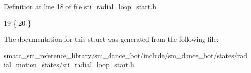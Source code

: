 Definition at line 18 of file sti\+\_\+radial\+\_\+loop\+\_\+start.\+h.


\begin{DoxyCode}
19   \{
20   \}
\end{DoxyCode}


The documentation for this struct was generated from the following file\+:\begin{DoxyCompactItemize}
\item 
smacc\+\_\+sm\+\_\+reference\+\_\+library/sm\+\_\+dance\+\_\+bot/include/sm\+\_\+dance\+\_\+bot/states/radial\+\_\+motion\+\_\+states/\hyperlink{include_2sm__dance__bot_2states_2radial__motion__states_2sti__radial__loop__start_8h}{sti\+\_\+radial\+\_\+loop\+\_\+start.\+h}\end{DoxyCompactItemize}
